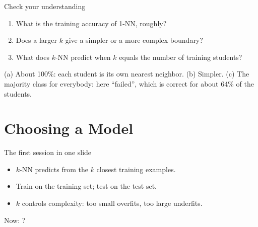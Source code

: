 \documentclass[handout,aspectratio=169,t,9pt]{beamer}
\begin{document}
\begin{frame}{Check your understanding}
  \begin{exercise}
    \begin{enumerate}[label=(\alph*),itemsep=2pt,topsep=3pt]
      \item What is the training accuracy of 1-NN, roughly?
      \item Does a larger $k$ give a simpler or a more complex boundary?
      \item What does $k$-NN predict when $k$ equals the number of
            training students?
    \end{enumerate}
  \end{exercise}

  \begin{solution}
    (a) About 100\%: each student is its own nearest neighbor.
    (b) Simpler.
    (c) The majority class for everybody: here ``failed'', which is
    correct for about 64\% of the students.
  \end{solution}

\end{frame}

\section{Choosing a Model}

\begin{frame}{The first session in one slide}
  \vspace{0.3cm}
  \begin{recap}
    \begin{itemize}
      \item $k$-NN predicts from the $k$ closest training examples.
      \item Train on the training set; test on the test set.
      \item $k$ controls complexity: too small overfits, too large
            underfits.
    \end{itemize}
  \end{recap}

  \vspace{0.6cm}
  Now: ?
\end{frame}
\end{document}
